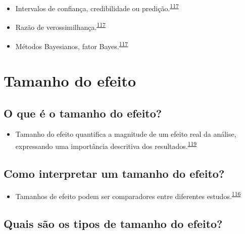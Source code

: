 \documentclass[
  a4paper,
]{book}
\providecommand{\tightlist}{%
  \setlength{\itemsep}{0pt}\setlength{\parskip}{0pt}}
\begin{document}
\begin{itemize}
\item
  Intervalos de confiança, credibilidade ou predição.\textsuperscript{\protect\hyperlink{ref-wasserstein2016}{117}}
\item
  Razão de verossimilhança.\textsuperscript{\protect\hyperlink{ref-wasserstein2016}{117}}
\item
  Métodos Bayesianos, fator Bayes.\textsuperscript{\protect\hyperlink{ref-wasserstein2016}{117}}
\end{itemize}

\hypertarget{tamanho-efeito}{%
\section{Tamanho do efeito}\label{tamanho-efeito}}

\hypertarget{o-que-uxe9-o-tamanho-do-efeito}{%
\subsection{O que é o tamanho do efeito?}\label{o-que-uxe9-o-tamanho-do-efeito}}

\begin{itemize}
\tightlist
\item
  Tamanho do efeito quantifica a magnitude de um efeito real da análise, expressando uma importância descritiva dos resultados.\textsuperscript{\protect\hyperlink{ref-Kim2015}{119}}
\end{itemize}

\hypertarget{como-interpretar-um-tamanho-do-efeito}{%
\subsection{Como interpretar um tamanho do efeito?}\label{como-interpretar-um-tamanho-do-efeito}}

\begin{itemize}
\tightlist
\item
  Tamanhos de efeito podem ser comparadores entre diferentes estudos.\textsuperscript{\protect\hyperlink{ref-Sullivan2012}{116}}
\end{itemize}

\hypertarget{quais-suxe3o-os-tipos-de-tamanho-do-efeito}{%
\subsection{Quais são os tipos de tamanho do efeito?}\label{quais-suxe3o-os-tipos-de-tamanho-do-efeito}}
\end{document}
